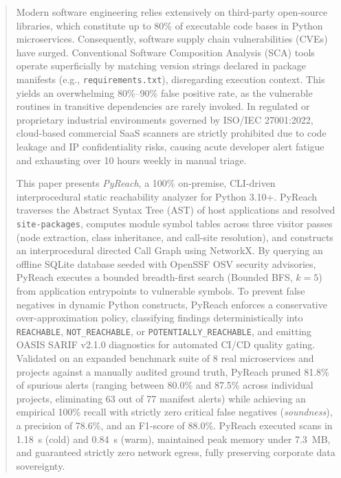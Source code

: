 \documentclass[conference]{IEEEtran}
\begin{document}
\begin{abstract}
Modern software engineering relies extensively on third-party open-source libraries, which constitute up to 80\% of executable code bases in Python microservices. Consequently, software supply chain vulnerabilities (CVEs) have surged. Conventional Software Composition Analysis (SCA) tools operate superficially by matching version strings declared in package manifests (e.g., \texttt{requirements.txt}), disregarding execution context. This yields an overwhelming 80\%--90\% false positive rate, as the vulnerable routines in transitive dependencies are rarely invoked. In regulated or proprietary industrial environments governed by ISO/IEC 27001:2022, cloud-based commercial SaaS scanners are strictly prohibited due to code leakage and IP confidentiality risks, causing acute developer alert fatigue and exhausting over 10 hours weekly in manual triage.

This paper presents \textit{PyReach}, a 100\% on-premise, CLI-driven interprocedural static reachability analyzer for Python 3.10+. PyReach traverses the Abstract Syntax Tree (AST) of host applications and resolved \texttt{site-packages}, computes module symbol tables across three visitor passes (node extraction, class inheritance, and call-site resolution), and constructs an interprocedural directed Call Graph using NetworkX. By querying an offline SQLite database seeded with OpenSSF OSV security advisories, PyReach executes a bounded breadth-first search (Bounded BFS, $k=5$) from application entrypoints to vulnerable symbols. To prevent false negatives in dynamic Python constructs, PyReach enforces a conservative over-approximation policy, classifying findings deterministically into \texttt{REACHABLE}, \texttt{NOT\_REACHABLE}, or \texttt{POTENTIALLY\_REACHABLE}, and emitting OASIS SARIF v2.1.0 diagnostics for automated CI/CD quality gating. Validated on an expanded benchmark suite of 8 real microservices and projects against a manually audited ground truth, PyReach pruned 81.8\% of spurious alerts (ranging between 80.0\% and 87.5\% across individual projects, eliminating 63 out of 77 manifest alerts) while achieving an empirical 100\% recall with strictly zero critical false negatives (\textit{soundness}), a precision of 78.6\%, and an F1-score of 88.0\%. PyReach executed scans in 1.18~s (cold) and 0.84~s (warm), maintained peak memory under 7.3~MB, and guaranteed strictly zero network egress, fully preserving corporate data sovereignty.
\end{abstract}
\end{document}
